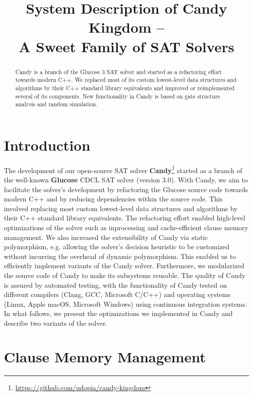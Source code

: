 \documentclass[conference]{IEEEtran}
\title{System Description of Candy Kingdom --\\ A Sweet Family of SAT Solvers}
\author{\IEEEauthorblockN{Markus Iser\IEEEauthorrefmark{1}
and Felix Kutzner\IEEEauthorrefmark{2}}
\IEEEauthorblockA{Institute for Theoretical Computer Science,
Karlsruhe Institute of Technology\\
Karlsruhe, Germany\\
Email: \IEEEauthorrefmark{1}markus.iser@kit.edu,
\IEEEauthorrefmark{2}felix.kutzner@qpr-technologies.de}}
\begin{document}
\maketitle

\begin{abstract}
Candy is a branch of the Glucose 3 SAT solver and started as a refactoring effort towards modern C++.
We replaced most of its custom lowest-level data structures and algorithms by their C++ standard library equivalents and improved or reimplemented several of its components.
New functionality in Candy is based on gate structure analysis and random simulation. 
\end{abstract}

\section{Introduction}

The development of our open-source SAT solver \textbf{Candy}\footnote{\url{https://github.com/udopia/candy-kingdom}} started as a branch of the well-known \textbf{Glucose} \cite{Audemard:2009:Glucose,Niklas:2003:Minisat} CDCL SAT solver (version 3.0).
With Candy, we aim to facilitate the solver's development by refactoring the Glucose source code towards modern C++ and by reducing dependencies within the source code.
This involved replacing most custom lowest-level data structures and algorithms by their C++ standard library equivalents.
The refactoring effort enabled high-level optimizations of the solver such as inprocessing and cache-efficient clause memory management.
We also increased the extensibility of Candy via static polymorphism, e.g. allowing the solver's decision heuristic to be customized without incurring the overhead of dynamic polymorphism. This enabled us to efficiently implement variants of the Candy solver.
Furthermore, we modularized the source code of Candy to make its subsystems reusable.
The quality of Candy is assured by automated testing, with the functionality of Candy tested on different compilers (Clang, GCC, Microsoft C/C++) and operating systems (Linux, Apple macOS, Microsoft Windows) using continuous integration systems.
In what follows, we present the optimizations we implemented in Candy and describe two variants of the solver.

\section{Clause Memory Management}
\label{sec:clauses}
\end{document}
